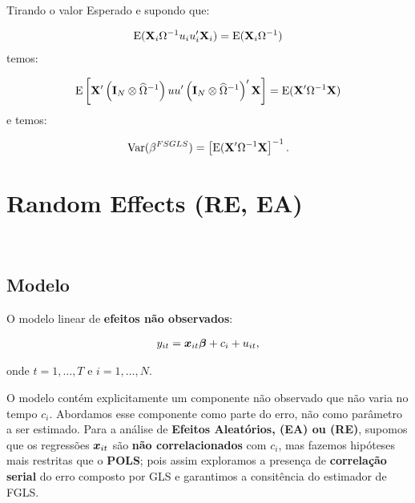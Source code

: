 \documentclass[11pt, oneside, a4paper, article]{article}
\numberwithin{equation}{section}
\begin{document}
\begin{description}
Tirando o valor Esperado e supondo que:

\vspace{-1.5 em}
\begin{align*}
\text{E}(\mathbf{X}_{i} \Omega^{-1} u_{i} u_{i}' \mathbf{X}_{i}) = \text{E}(\mathbf{X}_{i} \Omega^{-1})
\end{align*}
temos:

\vspace{-1.5 em}
\begin{align*}
\text{E}\left[ \mathbf{X}' \left( \mathbf{I}_{N} \otimes \widehat{\Omega}^{-1} \right)
	u u'
\left( \mathbf{I}_{N} \otimes \widehat{\Omega}^{-1} \right)' \mathbf{X} \right]
=
\text{E}(\mathbf{X}' \Omega^{-1} \mathbf{X})
\end{align*}
e temos:

\vspace{-1.5 em}
\begin{align*}
	\text{Var}(\beta^{FSGLS}) = \left[ \text{E}(\mathbf{X}' \Omega^{-1} \mathbf{X} \right]^{-1}.
\end{align*}

\clearpage
\section{Random Effects (RE, EA)}
\noindent
\citet[Sec.10.4 -- Random Effects Methods, p.257]{wool-2010} \\

\subsection{Modelo}

O modelo linear de \textbf{efeitos não observados}:

\vspace{-1 em}
\begin{align} \label{mod1:EA}
	y_{it} = \boldsymbol{x}_{it} \boldsymbol{\beta} + c_{i} + u_{it},
\end{align}

\noindent
onde
$t = 1, \dots, T$ e $i = 1, \dots, N$.

O modelo contém explicitamente um componente não observado que não varia no tempo $c_{i}$.
Abordamos esse componente como parte do erro, não como parâmetro a ser estimado.
Para a análise de \textbf{Efeitos Aleatórios, (EA) ou (RE)}, supomos que os regressões $\boldsymbol{x}_{it}$ são \textbf{não correlacionados} com $c_{i}$, mas fazemos hipóteses mais restritas que o \textbf{POLS}; pois assim exploramos a presença de \textbf{correlação serial} do erro composto por GLS e garantimos a consitência do estimador de FGLS.


\end{description}
\end{document}
